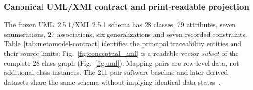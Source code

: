 \documentclass[12pt,a4paper]{article}
\begin{document}
\subsubsection{Canonical UML/XMI contract and print-readable projection}
\label{sec:arch_model}
The frozen UML~2.5.1/XMI~2.5.1 schema has 28 classes, 79 attributes, seven enumerations, 27 associations, six generalizations and seven recorded constraints. Table~\ref{tab:metamodel-contract} identifies the principal traceability entities and their source limits; Fig.~\ref{fig:conceptual_uml} is a readable vector \emph{subset} of the complete 28-class graph (Fig.~\ref{fig:uml}). Mapping pairs are row-level data, not additional class instances. The 211-pair software baseline and later derived datasets share the same schema without implying identical data states~\cite{OMG_UML_251,OMG_XMI_251,Eclipse_UML2_50_XMI}.
\end{document}
